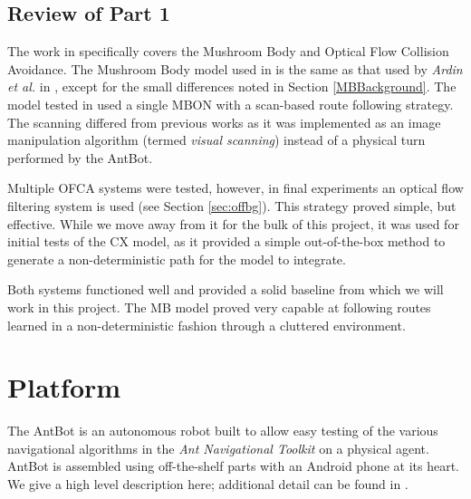 \documentclass[a4paper,11pt,twoside,openright]{article}
\let\oldsection\section
\def\section{\cleardoublepage\oldsection}
\begin{document}
\subsection{ Review of Part 1 }
The work in \cite{Mitchell2018} specifically covers the Mushroom Body
and Optical Flow Collision Avoidance. The Mushroom Body model used in
\cite{Mitchell2018} is the same as that used by \textit{Ardin et al.} in
\cite{Ardin2016}, except for the small differences noted in Section
\ref{MBBackground}. The model tested in \cite{Mitchell2018} used a single MBON
with a scan-based route following strategy. The scanning differed from previous
works as it was implemented as an image manipulation algorithm (termed
\textit{visual scanning}) instead of a physical turn performed by the AntBot.
\newline
\par

Multiple OFCA systems were tested, however, in final experiments an
optical flow filtering system is used (see Section
\ref{sec:offbg}). This strategy proved simple, but effective. While we
move away from it for the bulk of this project, it was used for
initial tests of the CX model, as it provided a simple out-of-the-box
method to generate a non-deterministic path for the model to
integrate.
\newline
\par

Both systems functioned well and provided a solid baseline from which we will
work in this project. The MB model proved very capable at following routes
learned in a non-deterministic fashion through a cluttered environment.

\newpage

\section{ Platform } \label{sec:platform}
The AntBot is an autonomous robot built to allow easy testing of the
various navigational algorithms in the \textit{Ant Navigational Toolkit}
on a physical agent. AntBot is assembled using off-the-shelf parts with an
Android phone at its heart. We give a high level description here; additional
detail can be found in \cite{Mitchell2018}.
\end{document}
